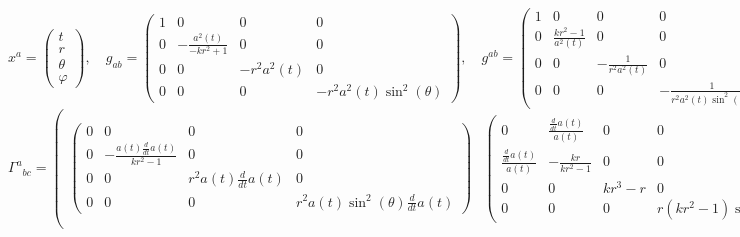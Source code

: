 \documentclass[11pt]{article}
\begin{document}
    $$x^{a}=\begin{pmatrix}t\\r\\\theta\\\varphi\end{pmatrix},\quad g_{ab}=\begin{pmatrix} 1 & 0 & 0 & 0\\ 0 & - \frac{a^{2}{\left(t \right)}}{- k r^{2} + 1} & 0 & 0\\ 0 & 0 & - r^{2} a^{2}{\left(t \right)} & 0\\ 0 & 0 & 0 & - r^{2} a^{2}{\left(t \right)} \sin^{2}{\left(\theta \right)} \end{pmatrix},\quad g^{ab}=\begin{pmatrix} 1 & 0 & 0 & 0\\ 0 & \frac{k r^{2} - 1}{a^{2}{\left(t \right)}} & 0 & 0\\ 0 & 0 & - \frac{1}{r^{2} a^{2}{\left(t \right)}} & 0\\ 0 & 0 & 0 & - \frac{1}{r^{2} a^{2}{\left(t \right)} \sin^{2}{\left(\theta \right)}} \end{pmatrix},$$
$${\Gamma^{a}}_{bc}=\begin{pmatrix} \begin{pmatrix} 0 & 0 & 0 & 0\\ 0 & - \frac{a{\left(t \right)} \frac{d}{d t} a{\left(t \right)}}{k r^{2} - 1} & 0 & 0\\ 0 & 0 & r^{2} a{\left(t \right)} \frac{d}{d t} a{\left(t \right)} & 0\\ 0 & 0 & 0 & r^{2} a{\left(t \right)} \sin^{2}{\left(\theta \right)} \frac{d}{d t} a{\left(t \right)} \end{pmatrix} & \begin{pmatrix} 0 & \frac{\frac{d}{d t} a{\left(t \right)}}{a{\left(t \right)}} & 0 & 0\\ \frac{\frac{d}{d t} a{\left(t \right)}}{a{\left(t \right)}} & - \frac{k r}{k r^{2} - 1} & 0 & 0\\ 0 & 0 & k r^{3} - r & 0\\ 0 & 0 & 0 & r \left(k r^{2} - 1\right) \sin^{2}{\left(\theta \right)} \end{pmatrix} & \begin{pmatrix} 0 & 0 & \frac{\frac{d}{d t} a{\left(t \right)}}{a{\left(t \right)}} & 0\\ 0 & 0 & \frac{1}{r} & 0\\ \frac{\frac{d}{d t} a{\left(t \right)}}{a{\left(t \right)}} & \frac{1}{r} & 0 & 0\\ 0 & 0 & 0 & - \sin{\left(\theta \right)} \cos{\left(\theta \right)} \end{pmatrix} & \begin{pmatrix} 0 & 0 & 0 & \frac{\frac{d}{d t} a{\left(t \right)}}{a{\left(t \right)}}\\ 0 & 0 & 0 & \frac{1}{r}\\ 0 & 0 & 0 & \frac{1}{\tan{\left(\theta \right)}}\\ \frac{\frac{d}{d t} a{\left(t \right)}}{a{\left(t \right)}} & \frac{1}{r} & \frac{1}{\tan{\left(\theta \right)}} & 0 \end{pmatrix} \end{pmatrix},$$
\end{document}
